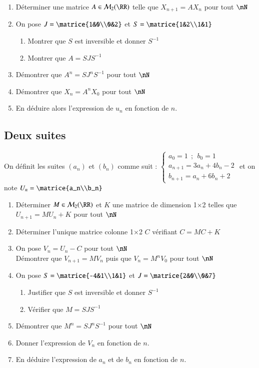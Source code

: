 \documentclass[oneside,12pt]{article}          %
\begin{document}
\begin{enumerate}
 	\item Déterminer une matrice $A\in\mathcal{M}_2(\RR)$ telle que $X_{n+1}=AX_n$ pour tout $\nN$
 	\item On pose $J=\matrice{1&0\\0&2}$ et $S=\matrice{1&2\\1&1}$
 	\begin{enumerate}
 		\item Montrer que $S$ est inversible et donner $S^{-1}$
 		\item Montrer que $A=SJS^{-1}$
 	\end{enumerate}
 	\item Démontrer que $A^n=SJ^nS^{-1}$ pour tout $\nN$
 	\item Démontrer que $X_n=A^nX_0$ pour tout $\nN$
 	\item En déduire alors l'expression de $u_n$ en fonction de $n$.
\end{enumerate}



\subsection{Deux suites}
On définit les suites $(a_n)$ et $(b_n)$ comme suit : $\begin{cases}a_0=1 ~~ ; ~~ b_0=1\\a_{n+1}=3a_n+4b_n-2\\b_{n+1}=a_n+6b_n+2\end{cases}$ et on note $U_n=\matrice{a_n\\b_n}$

\begin{enumerate}
	\item Déterminer $M\in\mathcal{M}_2(\RR)$ et $K$ une matrice de dimension 1$\times$2 telles que $U_{n+1}=MU_n+K$ pour tout $\nN$
	\item Déterminer l'unique matrice colonne 1$\times$2 $C$ vérifiant $C=MC+K$
	\item On pose $V_n=U_n-C$ pour tout $\nN$\\
	Démontrer que $V_{n+1}=MV_n$ puis que $V_n=M^nV_0$ pour tout $\nN$
	\item On pose $S=\matrice{-4&1\\1&1}$ et $J=\matrice{2&0\\0&7}$
	\begin{enumerate}
		\item Justifier que $S$ est inversible et donner $S^{-1}$
		\item Vérifier que $M=SJS^{-1}$
	\end{enumerate}
	\item Démontrer que $M^n=SJ^nS^{-1}$ pour tout $\nN$
	\item Donner l'expression de $V_n$ en fonction de $n$.
	\item En déduire l'expression de $a_n$ et de $b_n$ en fonction de $n$.
\end{enumerate}
\end{document}
